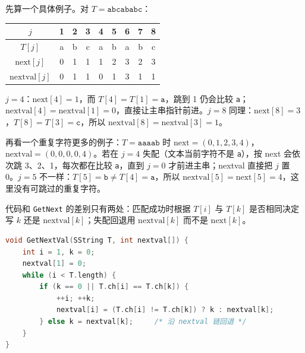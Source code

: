 先算一个具体例子。对 $T=\texttt{abcababc}$：
\begin{center}
\begin{tabular}{c|cccccccc}
$j$ & 1 & 2 & 3 & 4 & 5 & 6 & 7 & 8\\ \hline
$T[j]$ & a & b & c & a & b & a & b & c\\
$\mathrm{next}[j]$ & 0 & 1 & 1 & 1 & 2 & 3 & 2 & 3\\
$\mathrm{nextval}[j]$ & 0 & 1 & 1 & 0 & 1 & 3 & 1 & 1
\end{tabular}
\end{center}
$j=4$：$\mathrm{next}[4]=1$，而 $T[4]=T[1]=\texttt{a}$，跳到 1 仍会比较 \texttt{a}；$\mathrm{nextval}[4]=\mathrm{nextval}[1]=0$，直接让主串指针前进。$j=8$ 同理：$\mathrm{next}[8]=3$，$T[8]=T[3]=\texttt{c}$，所以 $\mathrm{nextval}[8]=\mathrm{nextval}[3]=1$。

再看一个重复字符更多的例子：$T=\texttt{aaaab}$ 时 $\mathrm{next}=(0,1,2,3,4)$，$\mathrm{nextval}=(0,0,0,0,4)$。若在 $j=4$ 失配（文本当前字符不是 \texttt{a}），按 next 会依次跳 3、2、1，每次都在比较 \texttt{a}，直到 $j=0$ 才前进主串；nextval 直接把 $j$ 置 0。$j=5$ 不一样：$T[5]=\texttt{b}\ne T[4]=\texttt{a}$，所以 $\mathrm{nextval}[5]=\mathrm{next}[5]=4$，这里没有可跳过的重复字符。

代码和 \texttt{GetNext} 的差别只有两处：匹配成功时根据 $T[i]$ 与 $T[k]$ 是否相同决定写 $k$ 还是 $\mathrm{nextval}[k]$；失配回退用 $\mathrm{nextval}[k]$ 而不是 $\mathrm{next}[k]$。

\begin{lstlisting}[language=C]
void GetNextVal(SString T, int nextval[]) {
    int i = 1, k = 0;
    nextval[1] = 0;
    while (i < T.length) {
        if (k == 0 || T.ch[i] == T.ch[k]) {
            ++i; ++k;
            nextval[i] = (T.ch[i] != T.ch[k]) ? k : nextval[k];
        } else k = nextval[k];     /* 沿 nextval 链回退 */
    }
}
\end{lstlisting}

